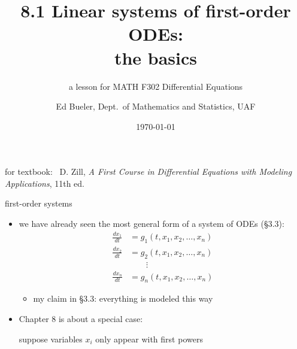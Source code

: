 \documentclass[urlcolor=blue,dvipsnames]{beamer}
\title{8.1 Linear systems of first-order ODEs: \\ the basics}
\subtitle{a lesson for MATH F302 Differential Equations}
\author{Ed Bueler, Dept.~of Mathematics and Statistics, UAF}
\date{\tiny \today}
\begin{document}
\renewcommand{\thefootnote}{{\color{green} \arabic{footnote}}}

\begin{frame}
\titlepage

\centerline{\tiny for textbook: \, D. Zill, \emph{A First Course in Differential Equations with Modeling Applications}, 11th ed.}
\end{frame}

\newcommand{\LL}[1]{\mathcal{L}\left\{#1\right\}}
\newcommand{\LLi}[1]{\mathcal{L}^{-1}\left\{#1\right\}}


\begin{frame}{first-order systems}

\begin{itemize}
\item we have already seen the most general form of a system of ODEs (\S3.3):
\begin{align*}
\frac{dx_1}{dt} &= g_1(t,x_1,x_2,\dots,x_n) \\
\frac{dx_2}{dt} &= g_2(t,x_1,x_2,\dots,x_n) \\
                &\qquad \vdots \\
\frac{dx_n}{dt} &= g_n(t,x_1,x_2,\dots,x_n)
\end{align*}
     \begin{itemize}
     \item my claim in \S3.3: everything is modeled this way
     \end{itemize}
\item Chapter 8 is about a special case:

\centerline{\alert{suppose variables $x_i$ only appear with first powers}}
\end{itemize}
\end{frame}
\end{document}
